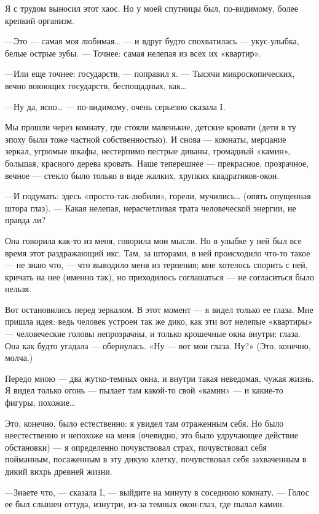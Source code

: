 \documentclass[11pt,openany]{book}
\begin{document}
Я с трудом выносил этот хаос. Но у моей спутницы был, по-видимому, более крепкий организм.

---Это --- самая моя любимая\ldots{} --- и вдруг будто спохватилась --- укус-улыбка, белые острые зубы. --- Точнее: самая нелепая из всех их «квартир».

---Или еще точнее: государств, --- поправил я. --- Тысячи микроскопических, вечно воюющих государств, беспощадных, как\ldots{}

---Ну да, ясно\ldots{} --- по-видимому, очень серьезно сказала I.

Мы прошли через комнату, где стояли маленькие, детские кровати (дети в ту эпоху были тоже частной собственностью). И снова --- комнаты, мерцание зеркал, угрюмые шкафы, нестерпимо пестрые диваны, громадный «камин», большая, красного дерева кровать. Наше теперешнее --- прекрасное, прозрачное, вечное --- стекло было только в виде жалких, хрупких квадратиков-окон.

---И подумать: здесь «просто-так-любили», горели, мучились\ldots{} (опять опущенная штора глаз). --- Какая нелепая, нерасчетливая трата человеческой энергии, не правда ли?

Она говорила как-то из меня, говорила мои мысли. Но в улыбке у ней был все время этот раздражающий икс. Там, за шторами, в ней происходило что-то такое --- не знаю что, --- что выводило меня из терпения; мне хотелось спорить с ней, кричать на нее (именно так), но приходилось соглашаться --- не согласиться было нельзя.

Вот остановились перед зеркалом. В этот момент --- я видел только ее глаза. Мне пришла идея: ведь человек устроен так же дико, как эти вот нелепые «квартиры» --- человеческие головы непрозрачны, и только крошечные окна внутри: глаза. Она как будто угадала --- обернулась. «Ну --- вот мои глаза. Ну?» (Это, конечно, молча.)

Передо мною --- два жутко-темных окна, и внутри такая неведомая, чужая жизнь. Я видел только огонь --- пылает там какой-то свой «камин» --- и какие-то фигуры, похожие\ldots{}

Это, конечно, было естественно: я увидел там отраженным себя. Но было неестественно и непохоже на меня (очевидно, это было удручающее действие обстановки) --- я определенно почувствовал страх, почувствовал себя пойманным, посаженным в эту дикую клетку, почувствовал себя захваченным в дикий вихрь древней жизни.

---Знаете что, --- сказала I, --- выйдите на минуту в соседнюю комнату. --- Голос ее был слышен оттуда, изнутри, из-за темных окон-глаз, где пылал камин.
\end{document}
